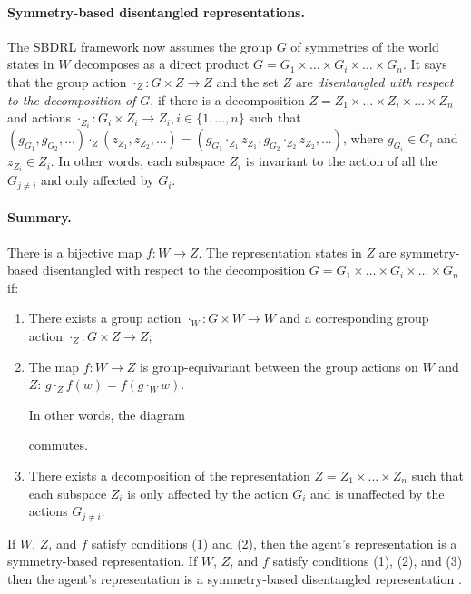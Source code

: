 \paragraph{Symmetry-based disentangled representations.}
The SBDRL framework now assumes the group $G$ of symmetries of the world states in $W$ decomposes as a direct product $G = G_1 \times \hdots \times G_i \times \hdots \times G_n$.
It says that the group action $\cdot_Z : G \times Z \to Z$ and the set $Z$ are \emph{disentangled with respect to the decomposition of $G$}, if there is a decomposition $Z = Z_1 \times \hdots \times Z_i \times \hdots \times Z_n$ and actions $\cdot_{Z_i}: G_i \times Z_i \to Z_i, i \in \{1, \hdots, n\}$ such that $(g_{G_1}, g_{G_2},...) \cdot_Z (z_{Z_1}, z_{Z_2},...) = (g_{G_1} \cdot_{Z_1} z_{Z_1}, g_{G_2} \cdot_{Z_2} z_{Z_2},...)$, where $g_{G_i} \in G_i$ and $z_{Z_i} \in Z_i$.
In other words, each subspace $Z_i$ is invariant to the action of all the $G_{j \neq i}$ and only affected by $G_i$.

\paragraph{Summary.}
There is a bijective map $f: W \to Z$.
The representation states in $Z$ are symmetry-based disentangled with respect to the decomposition $G = G_1 \times \hdots \times G_i \times \hdots \times G_n$ if:
\begin{enumerate}
	\item There exists a group action $\cdot_{W}: G \times W \to W$ and a corresponding group action $\cdot_{Z}: G \times Z \to Z$;
	\item The map $f : W \to Z$ is group-equivariant between the group actions on $W$ and $Z$: $g \cdot_{Z} f(w) = f(g \cdot_{W} w)$.

	      In other words, the diagram
	      
	      commutes.

	\item There exists a decomposition of the representation $Z = Z_1 \times \hdots \times Z_n$ such that each subspace $Z_i$ is only affected by the action $G_i$ and is unaffected by the actions $G_{j \neq i}$.
\end{enumerate}

If $W$, $Z$, and $f$ satisfy conditions (1) and (2), then the agent's representation is a symmetry-based representation.
If $W$, $Z$, and $f$ satisfy conditions (1), (2), and (3) then the agent's representation is a symmetry-based disentangled representation \autocite{caselles2019symmetry}.

